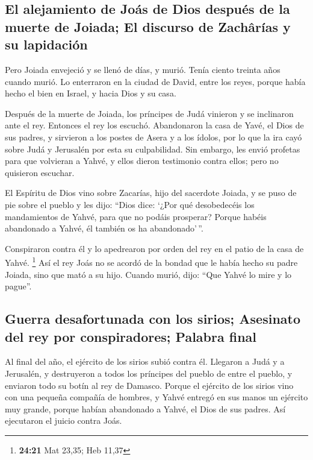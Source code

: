 \begin{paracol}{2}
\hypertarget{el-alejamiento-de-jouxe1s-de-dios-despuuxe9s-de-la-muerte-de-joiada-el-discurso-de-zachuxe2ruxedas-y-su-lapidaciuxf3n}{%
\subsection{El alejamiento de Joás de Dios después de la muerte de
Joiada; El discurso de Zachârías y su
lapidación}\label{el-alejamiento-de-jouxe1s-de-dios-despuuxe9s-de-la-muerte-de-joiada-el-discurso-de-zachuxe2ruxedas-y-su-lapidaciuxf3n}}

 Pero Joiada envejeció y se llenó de días, y murió. Tenía
ciento treinta años cuando murió.  Lo enterraron en la
ciudad de David, entre los reyes, porque había hecho el bien en Israel,
y hacia Dios y su casa.

 Después de la muerte de Joiada, los príncipes de Judá
vinieron y se inclinaron ante el rey. Entonces el rey los escuchó.
 Abandonaron la casa de Yavé, el Dios de sus padres, y
sirvieron a los postes de Asera y a los ídolos, por lo que la ira cayó
sobre Judá y Jerusalén por esta su culpabilidad.  Sin
embargo, les envió profetas para que volvieran a Yahvé, y ellos dieron
testimonio contra ellos; pero no quisieron escuchar.

 El Espíritu de Dios vino sobre Zacarías, hijo del
sacerdote Joiada, y se puso de pie sobre el pueblo y les dijo: ``Dios
dice: `¿Por qué desobedecéis los mandamientos de Yahvé, para que no
podáis prosperar? Porque habéis abandonado a Yahvé, él también os ha
abandonado'\,''.

 Conspiraron contra él y lo apedrearon por orden del rey
en el patio de la casa de Yahvé. \footnote{\textbf{24:21} Mat 23,35; Heb
  11,37}  Así el rey Joás no se acordó de la bondad que
le había hecho su padre Joiada, sino que mató a su hijo. Cuando murió,
dijo: ``Que Yahvé lo mire y lo pague''.

\hypertarget{guerra-desafortunada-con-los-sirios-asesinato-del-rey-por-conspiradores-palabra-final}{%
\subsection{Guerra desafortunada con los sirios; Asesinato del rey por
conspiradores; Palabra
final}\label{guerra-desafortunada-con-los-sirios-asesinato-del-rey-por-conspiradores-palabra-final}}

 Al final del año, el ejército de los sirios subió contra
él. Llegaron a Judá y a Jerusalén, y destruyeron a todos los príncipes
del pueblo de entre el pueblo, y enviaron todo su botín al rey de
Damasco.  Porque el ejército de los sirios vino con una
pequeña compañía de hombres, y Yahvé entregó en sus manos un ejército
muy grande, porque habían abandonado a Yahvé, el Dios de sus padres. Así
ejecutaron el juicio contra Joás.


\end{paracol}
